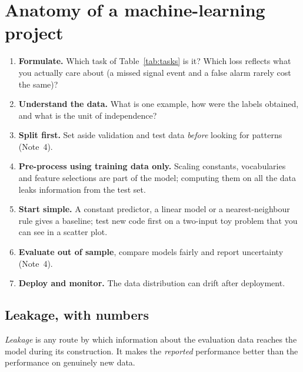 \documentclass[11pt]{article}
\begin{document}
\section{Anatomy of a machine-learning project}\label{sec:workflow}

\begin{enumerate}
\item \textbf{Formulate.} Which task of Table~\ref{tab:tasks} is it? Which loss reflects what you actually care about
(a missed signal event and a false alarm rarely cost the same)?
\item \textbf{Understand the data.} What is one example, how were the labels obtained, and what is the unit of
independence?
\item \textbf{Split first.} Set aside validation and test data \emph{before} looking for patterns (Note~4).
\item \textbf{Pre-process using training data only.} Scaling constants, vocabularies and feature selections are part
of the model; computing them on all the data leaks information from the test set.
\item \textbf{Start simple.} A constant predictor, a linear model or a nearest-neighbour rule gives a baseline; test
new code first on a two-input toy problem that you can see in a scatter plot.
\item \textbf{Evaluate out of sample}, compare models fairly and report uncertainty (Note~4).
\item \textbf{Deploy and monitor.} The data distribution can drift after deployment.
\end{enumerate}

\subsection{Leakage, with numbers}\label{sec:leakage}

\emph{Leakage} is any route by which information about the evaluation data reaches the model during its construction.
It makes the \emph{reported} performance better than the performance on genuinely new data.
\end{document}
